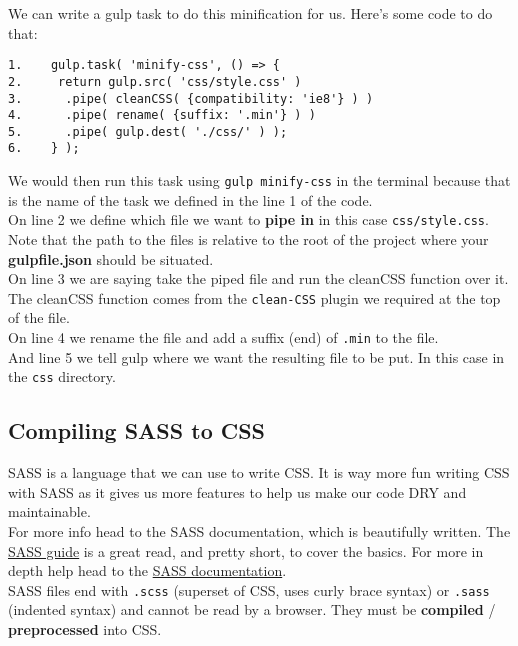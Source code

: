 We can write a gulp task to do this minification for us. Here's some code to do that:

	\begin{verbatim}
1.    gulp.task( 'minify-css', () => {
2.     return gulp.src( 'css/style.css' )
3.      .pipe( cleanCSS( {compatibility: 'ie8'} ) )
4.      .pipe( rename( {suffix: '.min'} ) )
5.      .pipe( gulp.dest( './css/' ) );
6.    } );

	\end{verbatim}

We would then run this task using \texttt{gulp minify-css} in the terminal because that is the name of the task we defined in the line 1 of the code.
\\

On line 2 we define which file we want to \textbf{pipe in} in this case \texttt{css/style.css}. Note that the path to the files is relative to the root of the project where your \textbf{gulpfile.json} should be situated.
\\

On line 3 we are saying take the piped file and run the cleanCSS function over it. The cleanCSS function comes from the \texttt{clean-CSS} plugin we required at the top of the file.
\\

On line 4 we rename the file and add a suffix (end) of \texttt{.min} to the file.
\\

And line 5 we tell gulp where we want the resulting file to be put. In this case in the \texttt{css} directory.
\\

\subsection{Compiling SASS to CSS}

SASS is a language that we can use to write CSS. It is way more fun writing CSS with SASS as it gives us more features to help us make our code DRY and maintainable.
\\

For more info head to the SASS documentation, which is beautifully written. The \href{https://sass-lang.com/guide}{SASS guide} is a great read, and pretty short, to cover the basics. For more in depth help head to the \href{https://sass-lang.com/documentation}{SASS documentation}.
\\

SASS files end with \texttt{.scss} (superset of CSS, uses curly brace syntax) or \texttt{.sass} (indented syntax) and cannot be read by a browser. They must be \textbf{compiled} / \textbf{preprocessed} into CSS.
\\

